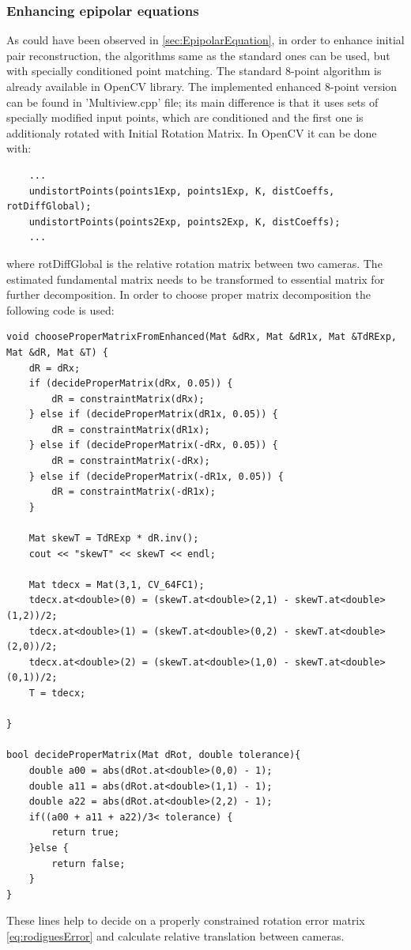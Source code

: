 \subsubsection{Enhancing epipolar equations}
As could have been observed in \ref{sec:EpipolarEquation}, in order to enhance initial pair reconstruction, the algorithms same as the standard ones can be used, but with specially conditioned point matching. The standard 8-point algorithm is already available in OpenCV library. The implemented enhanced 8-point version can be found in 'Multiview.cpp' file; its main difference is that it uses sets of specially modified input points, which are conditioned and the first one is additionaly rotated with Initial Rotation Matrix. In OpenCV it can be done with:
\begin{lstlisting}
    ...
    undistortPoints(points1Exp, points1Exp, K, distCoeffs, rotDiffGlobal);
    undistortPoints(points2Exp, points2Exp, K, distCoeffs);
    ...
\end{lstlisting}
where rotDiffGlobal is the relative rotation matrix between two cameras. The estimated fundamental matrix needs to be transformed to essential matrix for further decomposition. In order to choose proper matrix decomposition the following code is used:
\begin{lstlisting}
void chooseProperMatrixFromEnhanced(Mat &dRx, Mat &dR1x, Mat &TdRExp, Mat &dR, Mat &T) {
    dR = dRx;
    if (decideProperMatrix(dRx, 0.05)) {
        dR = constraintMatrix(dRx);
    } else if (decideProperMatrix(dR1x, 0.05)) {
        dR = constraintMatrix(dR1x);
    } else if (decideProperMatrix(-dRx, 0.05)) {
        dR = constraintMatrix(-dRx);
    } else if (decideProperMatrix(-dR1x, 0.05)) {
        dR = constraintMatrix(-dR1x);
    }

    Mat skewT = TdRExp * dR.inv();
    cout << "skewT" << skewT << endl;

    Mat tdecx = Mat(3,1, CV_64FC1);
    tdecx.at<double>(0) = (skewT.at<double>(2,1) - skewT.at<double>(1,2))/2;
    tdecx.at<double>(1) = (skewT.at<double>(0,2) - skewT.at<double>(2,0))/2;
    tdecx.at<double>(2) = (skewT.at<double>(1,0) - skewT.at<double>(0,1))/2;
    T = tdecx;

}

bool decideProperMatrix(Mat dRot, double tolerance){
    double a00 = abs(dRot.at<double>(0,0) - 1);
    double a11 = abs(dRot.at<double>(1,1) - 1);
    double a22 = abs(dRot.at<double>(2,2) - 1);
    if((a00 + a11 + a22)/3< tolerance) {
        return true;
    }else {
        return false;
    }
}
\end{lstlisting}
These lines help to decide on a properly constrained rotation error matrix \ref{eq:rodiguesError} and calculate relative translation between cameras.
